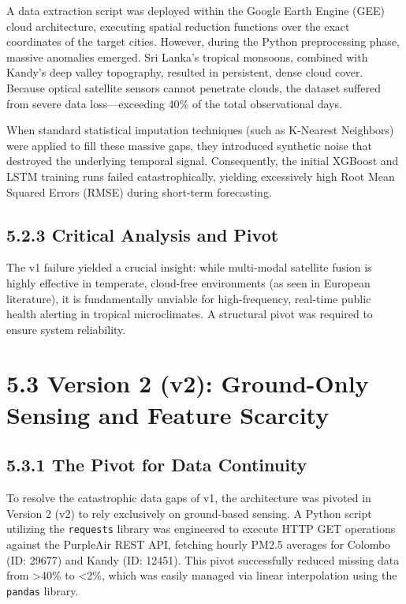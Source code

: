 A data extraction script was deployed within the Google Earth Engine
(GEE) cloud architecture, executing spatial reduction functions over the
exact coordinates of the target cities. However, during the Python
preprocessing phase, massive anomalies emerged. Sri Lanka's tropical
monsoons, combined with Kandy's deep valley topography, resulted in
persistent, dense cloud cover. Because optical satellite sensors cannot
penetrate clouds, the dataset suffered from severe data loss---exceeding
40\% of the total observational days.

When standard statistical imputation techniques (such as K-Nearest
Neighbors) were applied to fill these massive gaps, they introduced
synthetic noise that destroyed the underlying temporal signal.
Consequently, the initial XGBoost and LSTM training runs failed
catastrophically, yielding excessively high Root Mean Squared Errors
(RMSE) during short-term forecasting.

\subsection{5.2.3 Critical Analysis and
Pivot}\label{critical-analysis-and-pivot}

The v1 failure yielded a crucial insight: while multi-modal satellite
fusion is highly effective in temperate, cloud-free environments (as
seen in European literature), it is fundamentally unviable for
high-frequency, real-time public health alerting in tropical
microclimates. A structural pivot was required to ensure system
reliability.

\section{5.3 Version 2 (v2): Ground-Only Sensing and Feature
Scarcity}\label{version-2-v2-ground-only-sensing-and-feature-scarcity}

\subsection{5.3.1 The Pivot for Data
Continuity}\label{the-pivot-for-data-continuity}

To resolve the catastrophic data gaps of v1, the architecture was
pivoted in Version 2 (v2) to rely exclusively on ground-based sensing. A
Python script utilizing the \texttt{requests} library was engineered to
execute HTTP GET operations against the PurpleAir REST API, fetching
hourly PM2.5 averages for Colombo (ID: 29677) and Kandy (ID: 12451).
This pivot successfully reduced missing data from \textgreater40\% to
\textless2\%, which was easily managed via linear interpolation using
the \texttt{pandas} library.

